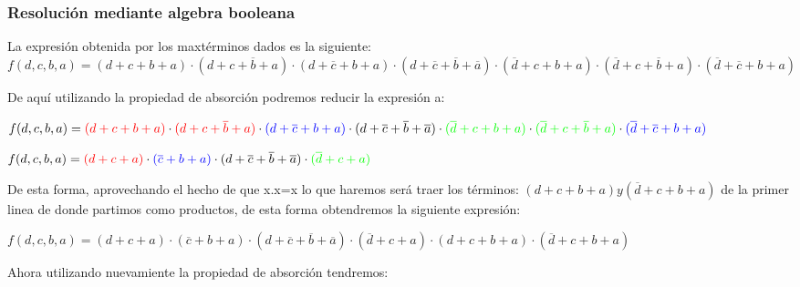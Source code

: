 \subsubsection{Resoluci\'on mediante algebra booleana}
\vspace{5mm}
\noindent
La expresi\'on obtenida por los maxt\'erminos dados es la siguiente:\\


$f(d,c,b,a)=(d+c+b+a)\cdot(d+c+\overline{b}+a)\cdot(d+\overline{c}+b+a)\cdot(d+\overline{c}+\overline{b}+\overline{a})\cdot(\overline{d}+c+b+a)\cdot(\overline{d}+c+\overline{b}+a)\cdot(\overline{d}+\overline{c}+b+a) $
\vspace{5mm}


\noindent
De aqu\'i utilizando la propiedad de absorci\'on podremos reducir la expresi\'on a:\par
\vspace{5mm}

$f(d,c,b,a)=\color{red}{(d+c+b+a)}\color{black}\cdot\color{red}{(d+c+\overline{b}+a)}\color{black}\cdot\color{blue}{(d+\overline{c}+b+a)}\color{black}\cdot\color{black}{(d+\overline{c}+\overline{b}+\overline{a})}\color{black}\cdot\color{green}{(\overline{d}+c+b+a)}\color{black}\cdot\color{green}{(\overline{d}+c+\overline{b}+a)}\color{black}\cdot\color{blue}{(\overline{d}+\overline{c}+b+a)}$
\vspace{8mm}\par
$f(d,c,b,a)=\color{red}{(d+c+a)}\color{black}\cdot\color{blue}{(\overline{c}+b+a)}\color{black}\cdot\color{black}{(d+\overline{c}+\overline{b}+\overline{a})}\color{black}\cdot\color{green}{(\overline{d}+c+a)}$
\vspace{8mm}\par

\noindent
De esta forma, aprovechando el hecho de que x.x=x lo que haremos ser\'a traer los t\'erminos: $(d+c+b+a) y (\overline{d}+c+b+a)$ de la primer linea de donde partimos como productos, de esta forma obtendremos la siguiente expresi\'on:\par
\vspace{5mm}

$f(d,c,b,a)={(d+c+a)}\cdot{(\overline{c}+b+a)}\cdot{(d+\overline{c}+\overline{b}+\overline{a})}\cdot{(\overline{d}+c+a)}\cdot{(d+c+b+a)}\cdot{(\overline{d}+c+b+a)}$
\vspace{8mm}\par

\noindent
Ahora utilizando nuevamiente la propiedad de absorci\'on tendremos:\par
\vspace{5mm}

